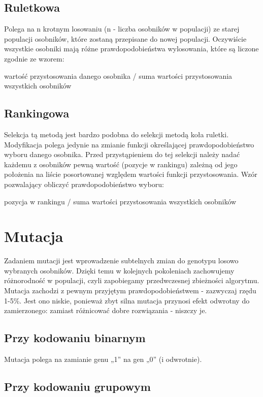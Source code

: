 \documentclass[11pt]{aghdpl}
\begin{document}
\section{Ruletkowa}
\label{sec:roulette}
Polega na n krotnym losowaniu (n - liczba osobników w populacji) ze starej populacji osobników, które zostaną przepisane do nowej populacji. Oczywiście wszystkie osobniki mają różne prawdopodobieństwa wylosowania, które są liczone zgodnie ze wzorem:
\begin{center}
wartość przystosowania danego osobnika / suma wartości przystosowania wszystkich osobników
\end{center}
 
\section{Rankingowa}
\label{sec:linear}
Selekcja tą metodą jest bardzo podobna do selekcji metodą koła ruletki. Modyfikacja polega jedynie na zmianie funkcji określającej prawdopodobieństwo wyboru danego osobnika. Przed przystąpieniem do tej selekcji należy nadać każdemu z osobników pewną wartość (pozycje w rankingu) zależną od jego położenia na liście posortowanej względem wartości funkcji przystosowania. Wzór pozwalający obliczyć prawdopodobieństwo wyboru:
\begin{center}
pozycja w rankingu / suma wartości przystosowania wszystkich osobników
\end{center}

\chapter{Mutacja}
\label{cha:mutation}
Zadaniem mutacji jest wprowadzenie subtelnych zmian do genotypu losowo wybranych osobników. Dzięki temu w kolejnych pokoleniach zachowujemy różnorodność w populacji, czyli zapobiegamy przedwczesnej zbieżności algorytmu. Mutacja zachodzi z pewnym przyjętym prawdopodobieństwem - zazwyczaj rzędu 1-5\%. Jest ono niskie, ponieważ zbyt silna mutacja przynosi efekt odwrotny do zamierzonego: zamiast różnicować dobre rozwiązania - niszczy je.

\section{Przy kodowaniu binarnym}
\label{sec:kodBin}
Mutacja polega na zamianie genu „1” na gen „0” (i odwrotnie).
\section{Przy kodowaniu grupowym}
\label{sec:kodGru}
\end{document}
